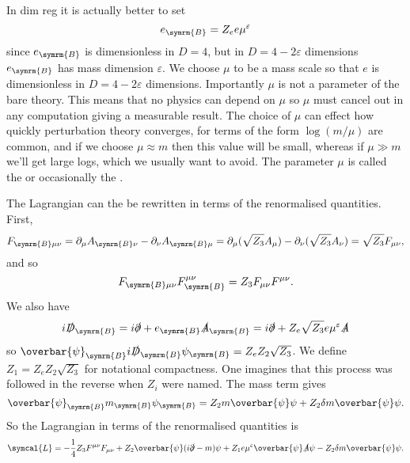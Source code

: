 \documentclass[fleqn]{NotesClass}
\newcommand{\diracadjoint}[1]{\overbar{#1}}
\newcommand{\covariantDerivative}{D}
\newcommand{\lagrangianDensity}{\symcal{L}}
\newcommand{\bare}{\symrm{B}}
\begin{document}
    In dim reg it is actually better to set
    \begin{equation}
        e_{\bare} = Z_e e \mu^\varepsilon
    \end{equation}
    since \(e_{\bare}\) is dimensionless in \(D = 4\), but in \(D = 4 - 2\varepsilon\) dimensions \(e_{\bare}\) has mass dimension \(\varepsilon\).
    We choose \(\mu\) to be a mass scale so that \(e\) is dimensionless in \(D = 4 - 2\varepsilon\) dimensions.
    Importantly \(\mu\) is not a parameter of the bare theory.
    This means that no physics can depend on \(\mu\) so \(\mu\) must cancel out in any computation giving a measurable result.
    The choice of \(\mu\) can effect how quickly perturbation theory converges, for terms of the form \(\log(m/\mu)\) are common, and if we choose \(\mu \approx m\) then this value will be small, whereas if \(\mu \gg m\) we'll get large logs, which we usually want to avoid.
    The parameter \(\mu\) is called the  or occasionally the .
    
    The Lagrangian can the be rewritten in terms of the renormalised quantities.
    First,
    \begin{equation}
        F_{\bare \mu\nu} = \partial_\mu A_{\bare \nu} - \partial_\nu A_{\bare \mu} = \partial_\mu (\sqrt{Z_3} A_\mu) - \partial_\nu (\sqrt{Z_3} A_\nu) = \sqrt{Z_3}F_{\mu\nu},
    \end{equation}
    and so
    \begin{equation}
        F_{\bare\mu\nu}F_{\bare}^{\mu\nu} = Z_3F_{\mu\nu}F^{\mu\nu}.
    \end{equation}
    We also have
    \begin{equation}
        i\slashed{\covariantDerivative}_{\bare} = i\slashed{\partial} + e_{\bare}\slashed{A}_{\bare} = i\slashed{\partial} + Z_e\sqrt{Z_3} e\mu^{\varepsilon} \slashed{A}
    \end{equation}
    so \(\diracadjoint{\psi}_{\bare} i\slashed{\covariantDerivative}_{\bare} \psi_{\bare} = Z_eZ_2\sqrt{Z_3}\).
    We define \(Z_1 = Z_e Z_2 \sqrt{Z_3}\) for notational compactness.
    One imagines that this process was followed in the reverse when \(Z_i\) were named.
    The mass term gives
    \begin{equation}
        \diracadjoint{\psi}_{\bare}m_{\bare}\psi_{\bare} = Z_2m\diracadjoint{\psi}\psi + Z_2\delta m\diracadjoint{\psi}\psi.
    \end{equation}
    So the Lagrangian in terms of the renormalised quantities is
    \begin{equation}
        \lagrangianDensity = -\frac{1}{4}Z_3F^{\mu\nu}F_{\mu\nu} + Z_2\diracadjoint{\psi}(i\slashed{\partial} - m)\psi + Z_1 e\mu^{\varepsilon} \diracadjoint{\psi}\slashed{A}\psi - Z_2 \delta m \diracadjoint{\psi} \psi.
    \end{equation}
    
\end{document}
